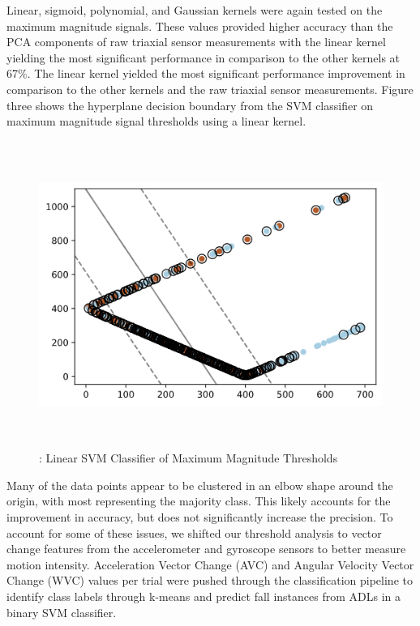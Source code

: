 \documentclass{llncs}
\begin{document}
	Linear, sigmoid, polynomial, and Gaussian kernels were again tested on the maximum magnitude signals. These values provided higher accuracy than the PCA components of raw triaxial sensor measurements with the linear kernel yielding the most significant performance in comparison to the other kernels at 67\%. The linear kernel yielded the most significant performance improvement in comparison to the other kernels and the raw triaxial sensor measurements. Figure three shows the hyperplane decision boundary from the SVM classifier on maximum magnitude signal thresholds using a linear kernel.
	
\begin{figure}
	\centering
	\includegraphics[width=12cm, height=10cm]{images/Classification/linear_classifier_boundary.png} 
	\caption{: Linear SVM Classifier of Maximum Magnitude Thresholds}
	\label{Figure 3: Linear Kernel SVM with Magnitude Thresholds Hyperplane}
\end{figure} 	

Many of the data points appear to be clustered in an elbow shape around the origin, with most representing the majority class. This likely accounts for the improvement in accuracy, but does not significantly increase the precision. To account for some of these issues, we shifted our threshold analysis to vector change features from the accelerometer and gyroscope sensors to better measure motion intensity. Acceleration Vector Change (AVC) and Angular Velocity Vector Change (WVC) values per trial were pushed through the classification pipeline to identify class labels through k-means and predict fall instances from ADLs in a binary SVM classifier.
	
\end{document}
